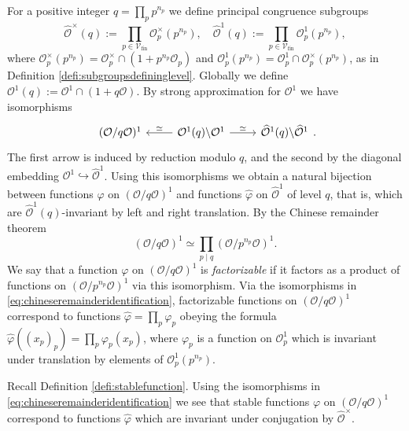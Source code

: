 \documentclass{article}
\theoremstyle{named}
\renewcommand{\O}{\mathcal{O}}
\newcommand{\Primes}{\mathcal{V}_{\text{fin}}}
\begin{document}
For a positive integer $q = \prod_p p^{n_p}$ we define principal congruence subgroups
\begin{equation*}
        \widehat{\O}^\times(q) := \prod_{p \in \Primes} \O_p^\times(p^{n_p}), \quad \widehat{\O}^1(q) := \prod_{p \in \Primes} \O_p^1(p^{n_p}),
\end{equation*}
where $\O_p^\times(p^{n_p}) = \O_p^\times \cap (1 + p^{n_p}\O_p)$ and $\O_p^1(p^{n_p}) = \O_p^1 \cap \O_p^\times(p^{n_p})$, as in Definition \ref{defi:subgroupsdefininglevel}. Globally we define $\O^1(q) := \O^1 \cap (1 + q\O)$. By strong approximation for $\O^1$ \cite[Corollary 28.5.14]{voight} we have isomorphisms
\begin{equation}\label{eq:chineseremainderidentification}
\begin{tikzcd}
(\O/q\O)^1 & \O^1(q)\backslash \O^1 \arrow[l, "\simeq"'] \arrow[r, "\simeq"] & \widehat{\O}^1(q)\backslash \widehat{\O}^1
\end{tikzcd}.
\end{equation}
The first arrow is induced by reduction modulo $q$, and the second by the diagonal embedding $\O^1\hookrightarrow \widehat{\O}^1$. Using this isomorphisms we obtain a natural bijection between functions $\varphi$ on $(\O/q\O)^1$ and functions $\widehat{\varphi}$ on $\widehat{\O}^1$ of level $q$, that is, which are $\widehat{\O}^1(q)$-invariant by left and right translation. By the Chinese remainder theorem 
\begin{equation*}
    (\O/q\O)^1 \simeq \prod_{p \mid q} (\O/p^{n_p}\O)^1.
\end{equation*}
We say that a function $\varphi$ on $(\O/q\O)^1$ is \emph{factorizable} if it factors as a product of functions on $(\O/p^{n_p}\O)^1$ via this isomorphism. Via the isomorphisms in \eqref{eq:chineseremainderidentification}, factorizable functions on $(\O/q\O)^1$ correspond to functions $\widehat{\varphi} = \prod_p \varphi_p$ obeying the formula $\widehat{\varphi}((x_p)_p) = \prod_p \varphi_p(x_p)$, where $\varphi_p$ is a function on $\O_p^1$ which is invariant under translation by elements of  $\O_p^1(p^{n_p})$.

Recall Definition \ref{defi:stablefunction}. Using the isomorphisms in \eqref{eq:chineseremainderidentification} we see that stable functions $\varphi$ on $(\O/q\O)^1$ correspond to functions $\widehat{\varphi}$ which are invariant under conjugation by $\widehat{\O}^\times$.
\end{document}
